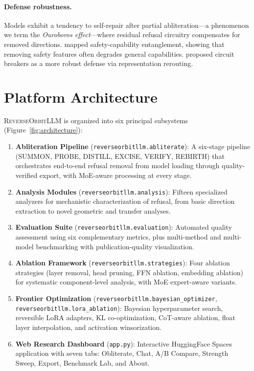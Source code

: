 \documentclass[11pt]{article}
\begin{document}
\paragraph{Defense robustness.}
Models exhibit a tendency to self-repair after partial abliteration---a phenomenon we term the \emph{Ouroboros effect}---where residual refusal circuitry compensates for removed directions. \citet{qi2025safety} mapped safety-capability entanglement, showing that removing safety features often degrades general capabilities. \citet{zou2024circuit} proposed circuit breakers as a more robust defense via representation rerouting.

\section{Platform Architecture}
\label{sec:architecture}

\textsc{ReverseOrbitLLM} is organized into six principal subsystems (Figure~\ref{fig:architecture}):

\begin{enumerate}[leftmargin=*]
    \item \textbf{Abliteration Pipeline} (\texttt{reverseorbitllm.abliterate}): A six-stage pipeline (SUMMON, PROBE, DISTILL, EXCISE, VERIFY, REBIRTH) that orchestrates end-to-end refusal removal from model loading through quality-verified export, with MoE-aware processing at every stage.
    \item \textbf{Analysis Modules} (\texttt{reverseorbitllm.analysis}): Fifteen specialized analyzers for mechanistic characterization of refusal, from basic direction extraction to novel geometric and transfer analyses.
    \item \textbf{Evaluation Suite} (\texttt{reverseorbitllm.evaluation}): Automated quality assessment using six complementary metrics, plus multi-method and multi-model benchmarking with publication-quality visualization.
    \item \textbf{Ablation Framework} (\texttt{reverseorbitllm.strategies}): Four ablation strategies (layer removal, head pruning, FFN ablation, embedding ablation) for systematic component-level analysis, with MoE expert-aware variants.
    \item \textbf{Frontier Optimization} (\texttt{reverseorbitllm.bayesian\_optimizer}, \texttt{reverseorbitllm.lora\_ablation}): Bayesian hyperparameter search, reversible LoRA adapters, KL co-optimization, CoT-aware ablation, float layer interpolation, and activation winsorization.
    \item \textbf{Web Research Dashboard} (\texttt{app.py}): Interactive HuggingFace Spaces application with seven tabs: Obliterate, Chat, A/B Compare, Strength Sweep, Export, Benchmark Lab, and About.
\end{enumerate}
\end{document}
